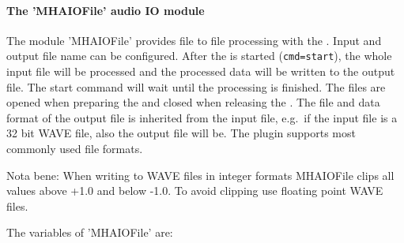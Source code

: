 
\paragraph{The 'MHAIOFile' audio IO module}%
%
%
%
%
\label{sec:MHAIOFile}%

The module 'MHAIOFile' provides file to file processing with the
\mha{}. Input and output file name can be configured. After the \mhad{}
is started (\verb!cmd=start!), the whole input file will be
processed and the processed data will be written to the output
file. The start command will wait until the processing is finished.
The files are opened when preparing the \mhad{} and closed when
releasing the \mhad{}. The file and data format of the output file
is inherited from the input file, e.g.\ if the input file is a 32 bit
WAVE file, also the output file will be. The plugin supports most
commonly used file formats.

Nota bene: When writing to WAVE files in integer formats MHAIOFile clips all
values above +1.0 and below -1.0. To avoid clipping use floating point WAVE files.

The variables of 'MHAIOFile' are:

\begin{description}
\end{description}

